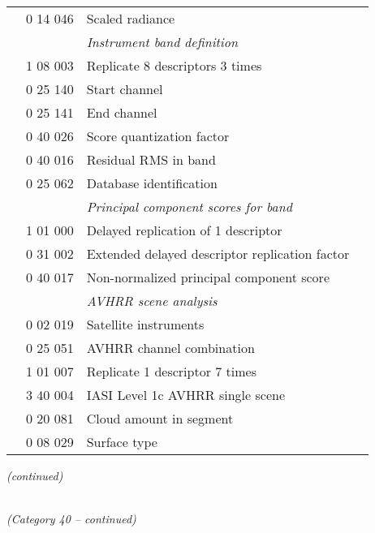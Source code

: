 \begin{longtable}[]{@{}llll@{}}
& 0 14 046 & Scaled radiance &\tabularnewline
& & \emph{Instrument band definition} &\tabularnewline
& 1 08 003 & Replicate 8 descriptors 3 times &\tabularnewline
& 0 25 140 & Start channel &\tabularnewline
& 0 25 141 & End channel &\tabularnewline
& 0 40 026 & Score quantization factor &\tabularnewline
& 0 40 016 & Residual RMS in band &\tabularnewline
& 0 25 062 & Database identification &\tabularnewline
& & \emph{Principal component scores for band} &\tabularnewline
& 1 01 000 & Delayed replication of 1 descriptor &\tabularnewline
& 0 31 002 & Extended delayed descriptor replication factor &\tabularnewline
& 0 40 017 & Non-normalized principal component score &\tabularnewline
& & \emph{AVHRR scene analysis} &\tabularnewline
& 0 02 019 & Satellite instruments &\tabularnewline
& 0 25 051 & AVHRR channel combination &\tabularnewline
& 1 01 007 & Replicate 1 descriptor 7 times &\tabularnewline
& 3 40 004 & IASI Level 1c AVHRR single scene &\tabularnewline
& 0 20 081 & Cloud amount in segment &\tabularnewline
& 0 08 029 & Surface type &\tabularnewline
\bottomrule
\end{longtable}

\emph{(continued)}

\emph{\\
(Category 40 -- continued)}

